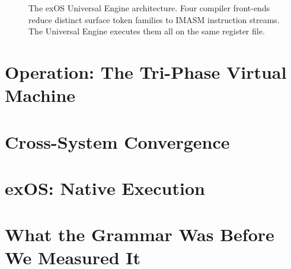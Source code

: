 \documentclass[12pt,a4paper]{article}
\begin{document}
\begin{figure}[htbp]
\caption{The exOS Universal Engine architecture. Four compiler front-ends reduce distinct surface token families to IMASM instruction streams. The Universal Engine executes them all on the same register file.}
\label{fig:exos}
\end{figure}


\section{Operation: The Tri-Phase Virtual Machine}
\label{sec:operation}

\section{Cross-System Convergence}
\label{sec:convergence}

\section{exOS: Native Execution}
\label{sec:exos}

\section{What the Grammar Was Before We Measured It}
\label{sec:conclusion}
\end{document}
